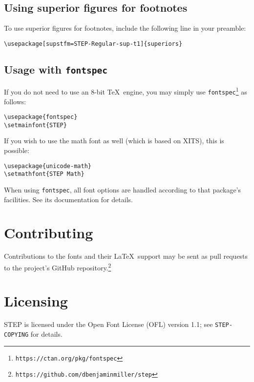 \documentclass[12pt]{article}
\begin{document}
\subsection{Using superior figures for footnotes}
To use superior figures for footnotes, include the following line in your preamble:
\begin{verbatim}
\usepackage[supstfm=STEP-Regular-sup-t1]{superiors}
\end{verbatim}
\subsection{Usage with \texttt{fontspec}}
If you do not need to use an 8-bit \TeX\ engine, you may simply use \texttt{fontspec}\footnote{\texttt{https://ctan.org/pkg/fontspec}} as follows:
\begin{verbatim}
\usepackage{fontspec}
\setmainfont{STEP}
\end{verbatim}
If you wish to use the math font as well (which is based on XITS), this is possible:
\begin{verbatim}
\usepackage{unicode-math}
\setmathfont{STEP Math}
\end{verbatim}
When using \texttt{fontspec}, all font options are handled according to that package's facilities. See its documentation for details.
\section{Contributing}
Contributions to the fonts and their \LaTeX\ support may be sent as pull requests to the project's GitHub repository.\footnote{\texttt{https://github.com/dbenjaminmiller/step}}
\section{Licensing}
STEP is licensed under the Open Font License (OFL) version 1.1; see \texttt{STEP-COPYING} for details.
\end{document}
